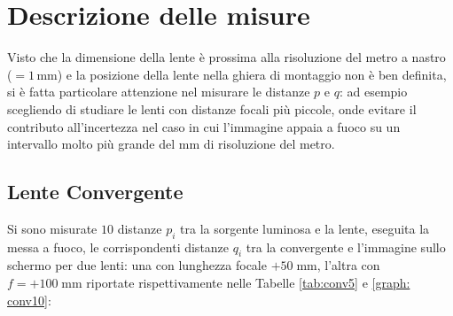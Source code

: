 \documentclass{article}[a4paper,11pt]
\begin{document}
\section{Descrizione delle misure}
Visto che la dimensione della lente \`e prossima alla risoluzione del metro a nastro ($= 1 \, \si{\mm}$) e la posizione della lente nella ghiera di montaggio non è ben definita, si \`e fatta particolare attenzione nel misurare le distanze  $p$ e $q$: ad esempio scegliendo di studiare le lenti con distanze focali più piccole, onde evitare il contributo all'incertezza nel caso in cui l'immagine appaia a fuoco su un intervallo molto pi\`u grande del $\si{\mm}$ di risoluzione del metro.
\subsection*{Lente Convergente}
Si sono misurate $10$ distanze $p_i$ tra la sorgente luminosa e la lente, eseguita la messa a fuoco, le corrispondenti distanze $q_i$ tra la convergente e l'immagine sullo schermo per due lenti: una con lunghezza focale $+50 \; \si{\mm}$, l'altra con $f = +100 \; \si{\mm}$ riportate rispettivamente nelle Tabelle \ref{tab:conv5} e \ref{graph: conv10}:
\end{document}
